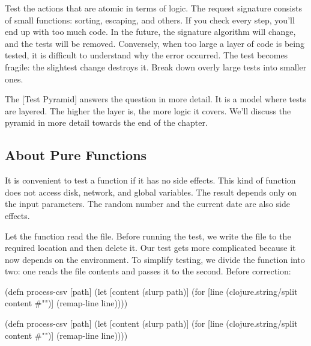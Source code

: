 Test the actions that are atomic in terms of logic. The request signature consists of small functions: sorting, escaping, and others. If you check every step, you'll end up with too much code. In the future, the signature algorithm will change, and the tests will be removed. Conversely, when too large a layer of code is being tested, it is difficult to understand why the error occurred. The test becomes fragile: the slightest change destroys it. Break down overly large tests into smaller ones.


The [Test Pyramid] answers the question in more detail. It is a model where tests are layered. The higher the layer is, the more logic it covers. We'll discuss the pyramid in more detail towards the end of the chapter.

\subsection{About Pure Functions}


It is convenient to test a function if it has no side effects. This kind of function does not access disk, network, and global variables. The result depends only on the input parameters. The random number and the current date are also side effects.

Let the function read the file. Before running the test, we write the file to the required location and then delete it. Our test gets more complicated because it now depends on the environment. To simplify testing, we divide the function into two: one reads the file contents and passes it to the second. Before correction:


\ifx\DEVICETYPE\MOBILE

\begin{english}
  \begin{clojure}
(defn process-csv [path]
  (let [content (slurp path)]
    (for [line (clojure.string/split
                 content #"\n")]
      (remap-line line))))
  \end{clojure}
\end{english}

\else

\begin{english}
  \begin{clojure}
(defn process-csv [path]
  (let [content (slurp path)]
    (for [line (clojure.string/split content #"\n")]
      (remap-line line))))
  \end{clojure}
\end{english}

